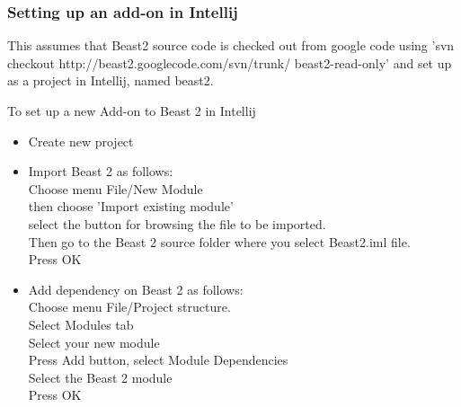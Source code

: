 \documentclass{article}
\begin{document}
\subsubsection{Setting up an add-on in Intellij}

This assumes that Beast2 source code is checked out from google code
using 'svn checkout http://beast2.googlecode.com/svn/trunk/ beast2-read-only' and set up 
as a project in Intellij, named beast2.

To set up a new Add-on to Beast 2 in Intellij

\begin{itemize}
\item Create new project
\item Import Beast 2 as follows:\\
Choose menu File/New Module\\
then choose 'Import existing module'\\
select the button for browsing the file to be imported.\\
Then go to the Beast 2 source folder where you select Beast2.iml
file.\\
Press OK
\item Add dependency on Beast 2 as follows:\\
Choose menu File/Project structure.\\
Select Modules tab\\
Select your new module\\
Press Add button, select Module Dependencies\\
Select the Beast 2 module\\
Press OK
\end{itemize}
\end{document}
